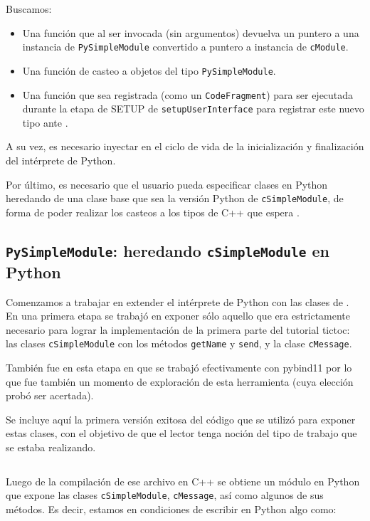 Buscamos:

\begin{itemize}
    \item Una función que al ser invocada (sin argumentos) devuelva un puntero
a una instancia de \verb!PySimpleModule! convertido a puntero a instancia de
\verb!cModule!.

    \item Una función de casteo a objetos del tipo \verb!PySimpleModule!.

    \item Una función que sea registrada (como un \verb!CodeFragment!) para ser
ejecutada durante la etapa de SETUP de \verb!setupUserInterface! para registrar
este nuevo tipo ante \omnetpp{}. 

\end{itemize}

A su vez, es necesario inyectar en el ciclo de vida de \omnetpp{} la
inicialización y finalización del intérprete de Python.

Por último, es necesario que el usuario pueda especificar clases en Python
heredando de una clase base que sea la versión Python de \verb!cSimpleModule!,
de forma de poder realizar los casteos a los tipos de C++ que espera \omnetpp{}.

\subsection{\texttt{PySimpleModule}: heredando \texttt{cSimpleModule} en Python}

Comenzamos a trabajar en extender el intérprete de Python con las clases de\linebreak
\omnetpp{}. En una primera etapa se trabajó en exponer sólo aquello que era
estrictamente necesario para lograr la implementación de la primera parte del
tutorial tictoc: las clases \verb!cSimpleModule! con los métodos
\verb!getName! y \verb!send!, y la clase \verb!cMessage!.

También fue en esta etapa en que se trabajó efectivamente con pybind11 por lo
que fue también un momento de exploración de esta herramienta (cuya elección
probó ser acertada).

Se incluye aquí la primera versión exitosa del código que se utilizó para
exponer estas clases, con el objetivo de que el lector tenga noción del tipo de
trabajo que se estaba realizando.

\inputminted{c++}{codelistings/binding.cc}

Luego de la compilación de ese archivo en C++ se obtiene un módulo en Python
que expone las clases \verb!cSimpleModule!, \verb!cMessage!, así como algunos
de sus métodos. Es decir, estamos en condiciones de escribir en Python algo
como:

